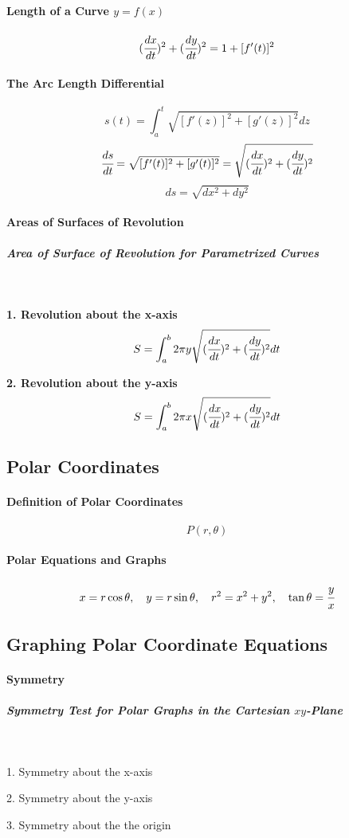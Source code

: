 \documentclass{article}
\begin{document}
            \paragraph{Length of a Curve $y=f(x)$}
                \[(\cfrac{dx}{dt})^2+(\cfrac{dy}{dt})^2=1+[f'(t)]^2\]
            \paragraph{The Arc Length Differential}
                \[s(t)=\int_a^t\sqrt{[f'(z)]^2+[g'(z)]^2}dz\]
                \[\cfrac{ds}{dt}=\sqrt{[f'(t)]^2+[g'(t)]^2}=\sqrt{(\cfrac{dx}{dt})^2+(\cfrac{dy}{dt})^2}\]
                \[ds=\sqrt{dx^2+dy^2}\]
            \paragraph{Areas of Surfaces of Revolution}
                \subparagraph{Area of Surface of Revolution for Parametrized Curves}
                \text{}\\
                \par \textbf{1. Revolution about the x-axis}
                \[S=\int_a^b 2\pi y\sqrt{(\cfrac{dx}{dt})^2+(\cfrac{dy}{dt})^2}dt\]
                \par \textbf{2. Revolution about the y-axis}
                \[S=\int_a^b 2\pi x\sqrt{(\cfrac{dx}{dt})^2+(\cfrac{dy}{dt})^2}dt\]
        \subsection{Polar Coordinates}
            \paragraph{Definition of Polar Coordinates}
                \[P(r,\theta)\]
            \paragraph{Polar Equations and Graphs}
                \[x=r\cos \theta,\quad y=r\sin\theta,\quad r^2=x^2+y^2,\quad \tan\theta=\cfrac{y}{x}\]
        \subsection{Graphing Polar Coordinate Equations}
            \paragraph{Symmetry}
                \subparagraph{Symmetry Test for Polar Graphs in the Cartesian $xy$-Plane}
                \text{}\\
                \par 1. Symmetry about the x-axis
                \par 2. Symmetry about the y-axis
                \par 3. Symmetry about the the origin 
\end{document}
